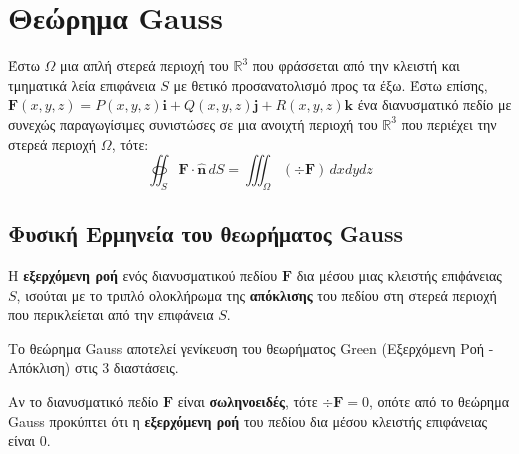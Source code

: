 \section*{Θεώρημα Gauss}

Έστω $\Omega$ μια απλή στερεά περιοχή του $ \mathbb{R}^{3} $ που φράσσεται από 
την κλειστή και τμηματικά λεία επιφάνεια $S$ με θετικό προσανατολισμό προς τα έξω.  
Έστω επίσης, 
$ \mathbf{F}(x,y,z) = P(x,y,z)\mathbf{i}+Q(x,y,z)\mathbf{j}+R(x,y,z)\mathbf{k} $ ένα 
διανυσματικό πεδίο με συνεχώς παραγωγίσιμες συνιστώσες σε μια ανοιχτή περιοχή του 
$ \mathbb{R}^{3} $ που περιέχει την στερεά περιοχή $\Omega$, τότε:
\[
  \oiint_{S} \mathbf{F} \cdot \mathbf{\widehat{n}} \,{dS} = \iiint_{\Omega} (\div
  \mathbf{F}) \,{dx}{dy}{dz}
\]

\subsection*{Φυσική Ερμηνεία του θεωρήματος Gauss}

Η \textbf{εξερχόμενη ροή} ενός διανυσματικού πεδίου $ \mathbf{F} $ δια μέσου μιας
κλειστής επιϕάνειας $S$, ισούται με το τριπλό ολοκλήρωμα της \textbf{απόκλισης} του 
πεδίου στη στερεά περιοχή που περικλείεται από την επιφάνεια $S$.

\begin{rems}
\item {}
  \begin{myitemize}
    \item Το θεώρημα Gauss αποτελεί γενίκευση του θεωρήματος Green (Εξερχόμενη Ροή -
      Απόκλιση) στις 3 διαστάσεις. 
    \item Αν το διανυσματικό πεδίο $ \mathbf{F} $ είναι \textbf{σωληνοειδές}, 
      τότε $ \div \mathbf{F} = 0 $, οπότε από το θεώρημα Gauss προκύπτει ότι 
      η \textbf{εξερχόμενη ροή} του πεδίου δια μέσου κλειστής επιφάνειας είναι 0.
  \end{myitemize}
\end{rems}


